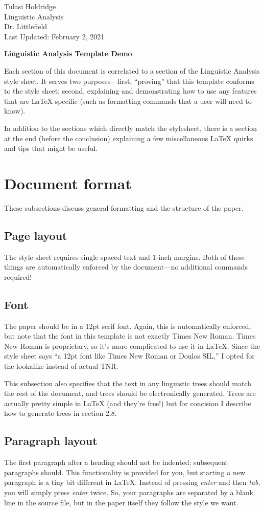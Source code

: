 \documentclass[12pt]{article}
\newcommand{\titletext}[1]
{\begin{center}
		\textbf{#1}
\end{center}}
\newcommand{\headertext}[4]
{\begin{flushleft}
		#1
		\\ #2
		\\ #3
		\\ #4
\end{flushleft}}
\begin{document}
	
	\headertext{Tulasi Holdridge}{Linguistic Analysis}{Dr. Littlefield}{Last Updated: February 2, 2021}
	
	\titletext{Linguistic Analysis Template Demo}
	Each section of this document is correlated to a section of the Linguistic Analysis style sheet. It serves two purposes---first, ``proving'' that this template conforms to the style sheet; second, explaining and demonstrating how to use any features that are LaTeX-specific (such as formatting commands that a user will need to know).
	
	In addition to the sections which directly match the stylesheet, there is a section at the end (before the conclusion) explaining a few miscellaneous LaTeX quirks and tips that might be useful.
	
	\section{Document format}
	These subsections discuss general formatting and the structure of the paper.
	
	\subsection{Page layout}
	The style sheet requires single spaced text and 1-inch margins. Both of these things are automatically enforced by the document---no additional commands required!
	
	\subsection{Font}
	The paper should be in a 12pt serif font. Again, this is automatically enforced, but note that the font in this template is not exactly Times New Roman. Times New Roman is proprietary, so it's more complicated to use it in LaTeX. Since the style sheet says ``a 12pt font like Times New Roman or Doulos SIL,'' I opted for the lookalike instead of actual TNR.
	
	This subsection also specifies that the text in any linguistic trees should match the rest of the document, and trees should be electronically generated. Trees are actually pretty simple in LaTeX (and they're free!) but for concision I describe how to generate trees in section 2.8.
	
	\subsection{Paragraph layout}
	The first paragraph after a heading should not be indented; subsequent paragraphs should. This functionality is provided for you, but starting a new paragraph is a tiny bit different in LaTeX. Instead of pressing \textit{enter} and then \textit{tab}, you will simply press \textit{enter} twice. So, your paragraphs are separated by a blank line in the source file, but in the paper itself they follow the style we want.
	
\end{document}
